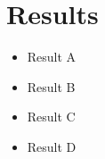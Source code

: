 \section{Results}
\begin{frame}
    \begin{itemize}
        \item Result A
        \item Result B
        \item Result C
        \item Result D
    \end{itemize}
\end{frame}
